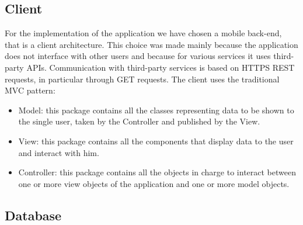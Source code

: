 \clearpage

\subsection{Client}
For the implementation of the application we have chosen a mobile back-end, that is a client architecture. This choice was made mainly because the application does not interface with other users and because for various services it uses third-party APIs. Communication with third-party services is based on HTTPS REST requests, in particular through GET requests.
The client uses the traditional MVC pattern:
\begin{itemize}
\item Model: this package contains all the classes representing data to be shown to the single user, taken by the Controller and published by the View.
\item View: this package contains all the components that display data to the user and interact with him.
\item Controller: this package contains all the objects in charge to interact between one or more view objects of the application and one or more model objects.
\end{itemize}

\subsection{Database}
